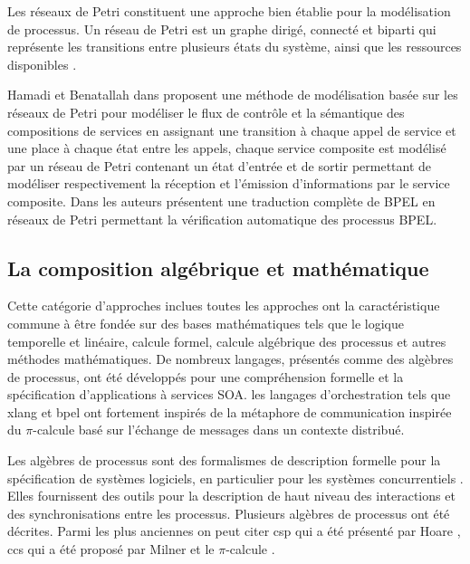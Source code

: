     Les réseaux de Petri \cite{petri1962kommunikation} constituent une
    approche bien établie pour la modélisation de processus. Un réseau
    de Petri est un graphe dirigé, connecté et biparti qui représente
    les transitions entre plusieurs états du système, ainsi que les
    ressources disponibles \cite{dumez2010approche}.

    Hamadi et Benatallah dans \cite{hamadi2003petri} proposent une
    méthode de modélisation basée sur les réseaux de Petri pour
    modéliser le flux de contrôle et la sémantique des compositions de
    services en assignant une transition à chaque appel de service et
    une place à chaque état entre les appels, chaque service composite
    est modélisé par un réseau de Petri contenant un état d'entrée et
    de sortir permettant de modéliser respectivement la réception et
    l'émission d'informations par le service composite. Dans
    \cite{ouyang2007formal} les auteurs présentent une traduction
    complète de \textsc{BPEL} en réseaux de Petri permettant la
    vérification automatique des processus \textsc{BPEL}.

    \subsection{La composition algébrique et mathématique}
    \label{sec:les-apprc-math}
    Cette catégorie d'approches inclues toutes les approches ont la
    caractéristique commune à être fondée sur des bases mathématiques
    tels que le logique temporelle et linéaire, calcule formel,
    calcule algébrique des processus et autres méthodes
    mathématiques. De nombreux langages, présentés comme des algèbres
    de processus, ont été développés pour une compréhension formelle
    et la spécification d'applications à services \textsc{SOA}. les
    langages d'orchestration tels que \acrshort{xlang} et
    \acrshort{bpel} ont fortement inspirés de la métaphore de
    communication inspirée du $\pi$-calcule basé sur l'échange de
    messages dans un contexte distribué.

    Les algèbres de processus sont des formalismes de description
    formelle pour la spécification de systèmes logiciels, en
    particulier pour les systèmes concurrentiels
    \cite{dumez2010approche}. Elles fournissent des outils pour la
    description de haut niveau des interactions et des
    synchronisations entre les processus. Plusieurs algèbres de
    processus ont été décrites. Parmi les plus anciennes on peut citer
    \acrshort{csp} qui a été présenté par Hoare
    \cite{hoare1978communicating}, \acrshort{ccs} qui a été proposé
    par Milner \cite{milner1982finite, milner1989communication} et le
    $\pi$-calcule \cite{milner1992calculus}.

